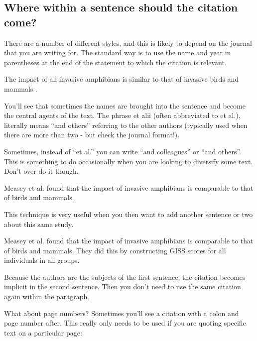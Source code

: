 \documentclass[
]{krantz}
\renewenvironment{quote}{\begin{VF}}{\end{VF}}
\begin{document}
\hypertarget{where-within-a-sentence-should-the-citation-come}{%
\subsection{Where within a sentence should the citation come?}\label{where-within-a-sentence-should-the-citation-come}}

There are a number of different styles, and this is likely to depend on the journal that you are writing for. The standard way is to use the name and year in parentheses at the end of the statement to which the citation is relevant.

The impact of all invasive amphibians is similar to that of invasive birds and mammals \citep{measey2016global}.

You'll see that sometimes the names are brought into the sentence and become the central agents of the text. The phrase et alii (often abbreviated to et al.), literally means ``and others'' referring to the other authors (typically used when there are more than two - but check the journal format!).

Sometimes, instead of ``et al.'' you can write ``and colleagues'' or ``and others''. This is something to do occasionally when you are looking to diversify some text. Don't over do it though.

\begin{quote}
Measey et al. \citeyearpar{measey2016global} found that the impact of invasive amphibians is comparable to that of birds and mammals.
\end{quote}

This technique is very useful when you then want to add another sentence or two about this same study.

\begin{quote}
Measey et al. \citeyearpar{measey2016global} found that the impact of invasive amphibians is comparable to that of birds and mammals. They did this by constructing GISS scores for all individuals in all groups.
\end{quote}

Because the authors are the subjects of the first sentence, the citation becomes implicit in the second sentence. Then you don't need to use the same citation again within the paragraph.

What about page numbers?
Sometimes you'll see a citation with a colon and page number after. This really only needs to be used if you are quoting specific text on a particular page:
\end{document}
